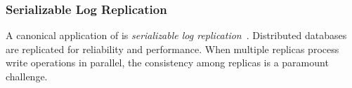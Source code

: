 
\subsubsection{Serializable Log Replication}
\label{subsec:log-replication}

A canonical application of \sys is \textit{serializable log replication}~\cite{birman1985replication,petersen1997flexible,belaramani2006practi}.
Distributed databases are replicated for reliability and performance.
When multiple replicas process write operations in parallel, the consistency among replicas is a paramount challenge.


